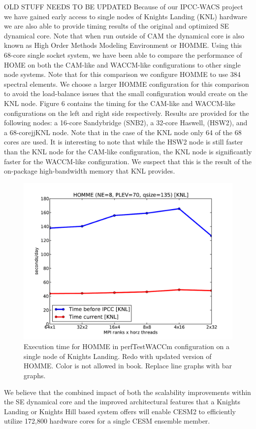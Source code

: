 {\color{red}  OLD STUFF NEEDS TO BE UPDATED}
Because of our IPCC-WACS project we have gained early access to single nodes of Knights Landing (KNL) hardware we are also able to provide timing results of the original and optimized SE dynamical core.  Note that when run outside of CAM the dynamical core is also known as High Order Methods Modeling Environment or HOMME.  Using this 68-core single socket system, we have been able to compare the performance of HOME on both the CAM-like and WACCM-like configurations to other single node systems.  Note that for this comparison we configure HOMME to use 384 spectral elements. We choose a larger HOMME configuration for this comparison to avoid the load-balance issues that the small configuration would create on the KNL node.  Figure 6 contains the timing for the CAM-like and WACCM-like configurations on the left and right side respectively. Results are provided for the following nodes:  a 16-core Sandybridge (SNB2), a 32-core Haswell, (HSW2), and a 68-corejjKNL node.  Note that in the case of the KNL node only 64 of the 68 cores are used.  It is interesting to note that while the HSW2 node is still faster than the KNL node for the CAM-like configuration, the KNL node is significantly faster for the WACCM-like configuration. We suspect that this is the result of the on-package high-bandwidth memory that KNL provides.

\begin{figure}[]
 \begin{center}
\includegraphics[width=12.0cm]{figures/homme-knl-waccm.pdf}
\end{center}
\caption{Execution time for HOMME in perfTestWACCm configuration on a single node of Knights Landing.{\color{red} Redo with updated version of HOMME.  Color is not allowed in book.  Replace line graphs with bar graphs.}}
\label{fig:homme-knl}
\end{figure}


We believe that the combined impact of both the scalability improvements within the SE dynamical core and the improved architectural features that a Knights Landing or Knights Hill based system offers will enable CESM2 to efficiently utilize 172,800 hardware cores for a single CESM ensemble member. 
